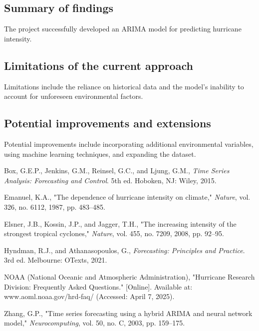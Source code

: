 \documentclass{article}
\begin{document}
	\subsection{Summary of findings}
	The project successfully developed an ARIMA model for predicting hurricane intensity.
	
	\subsection{Limitations of the current approach}
	Limitations include the reliance on historical data and the model's inability to account for unforeseen environmental factors.
	
	\subsection{Potential improvements and extensions}
	Potential improvements include incorporating additional environmental variables, using machine learning techniques, and expanding the dataset.
	
	\begin{thebibliography}{9}
		Box, G.E.P., Jenkins, G.M., Reinsel, G.C., and Ljung, G.M., \textit{Time Series Analysis: Forecasting and Control}. 5th ed. Hoboken, NJ: Wiley, 2015.
		
		Emanuel, K.A., "The dependence of hurricane intensity on climate," \textit{Nature}, vol. 326, no. 6112, 1987, pp. 483–485.
		
		Elsner, J.B., Kossin, J.P., and Jagger, T.H., "The increasing intensity of the strongest tropical cyclones," \textit{Nature}, vol. 455, no. 7209, 2008, pp. 92–95.
		
		Hyndman, R.J., and Athanasopoulos, G., \textit{Forecasting: Principles and Practice}. 3rd ed. Melbourne: OTexts, 2021.
		
		NOAA (National Oceanic and Atmospheric Administration), "Hurricane Research Division: Frequently Asked Questions." [Online]. Available at: www.aoml.noaa.gov/hrd-faq/ (Accessed: April 7, 2025).
		
		Zhang, G.P., "Time series forecasting using a hybrid ARIMA and neural network model," \textit{Neurocomputing}, vol. 50, no. C, 2003, pp. 159–175.
	\end{thebibliography}
	
\end{document}
